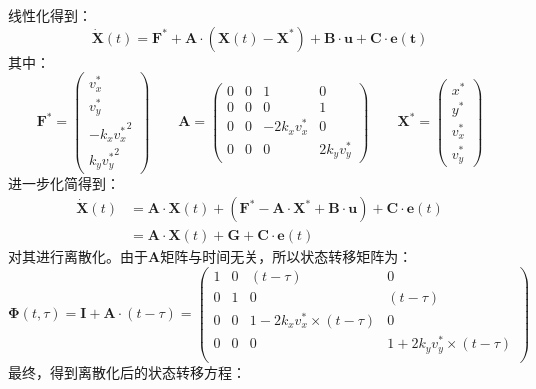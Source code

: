 \documentclass[12pt, onecolumn]{article}
\begin{document}
	线性化得到：
	\begin{equation}
	\dot{\boldsymbol{X}}(t)=\boldsymbol{F^*}+\boldsymbol{A}\cdot\left( \boldsymbol{X}(t)-\boldsymbol{X^*}\right) +\boldsymbol{B}\cdot\boldsymbol{u}+\boldsymbol{C}\cdot\boldsymbol{e(t)}
	\end{equation}
	其中：
	\begin{equation}
	\boldsymbol{F^*}=\begin{pmatrix}
		v_x^*\\
		v_y^*\\
		-k_x {v^*_x}^2\\
		k_y {v^*_y}^2
		\end{pmatrix}
	\qquad
	\boldsymbol{A}=\begin{pmatrix}
		0&0&1&0\\
		0&0&0&1\\
		0&0&-2 k_x v_x^*&0\\
		0&0&0&2 k_y v_y^*
		\end{pmatrix}
		\qquad
		\boldsymbol{X^*}=\begin{pmatrix}
			x^*\\y^*\\v_x^*\\v_y^*
			\end{pmatrix}
	\end{equation}
	进一步化简得到：
	\begin{equation}
	\begin{aligned}
	\dot{\boldsymbol{X}}(t)&=\boldsymbol{A}\cdot\boldsymbol{X}(t)
		+\left( \boldsymbol{F^*}-\boldsymbol{A}\cdot\boldsymbol{X^*}+\boldsymbol{B}\cdot\boldsymbol{u}\right) 
		+\boldsymbol{C}\cdot\boldsymbol{e}(t)
		\\
		&=\boldsymbol{A}\cdot\boldsymbol{X}(t)
				+\boldsymbol{G}
				+\boldsymbol{C}\cdot\boldsymbol{e}(t)
	\end{aligned}
	\end{equation}
	对其进行离散化。由于$\boldsymbol{A}$矩阵与时间无关，所以状态转移矩阵为：
	\begin{equation}
	\boldsymbol{\Phi}(t,\tau)=\boldsymbol{I}+\boldsymbol{A}\cdot(t-\tau)=
	\begin{pmatrix}
	1&0&(t-\tau)&0\\
	0&1&0&(t-\tau)\\
	0&0&1-2 k_x v_x^*\times(t-\tau)&0\\
	0&0&0&1+2 k_y v_y^*\times(t-\tau)\\
	\end{pmatrix}
	\end{equation}
	最终，得到离散化后的状态转移方程：
\end{document}
